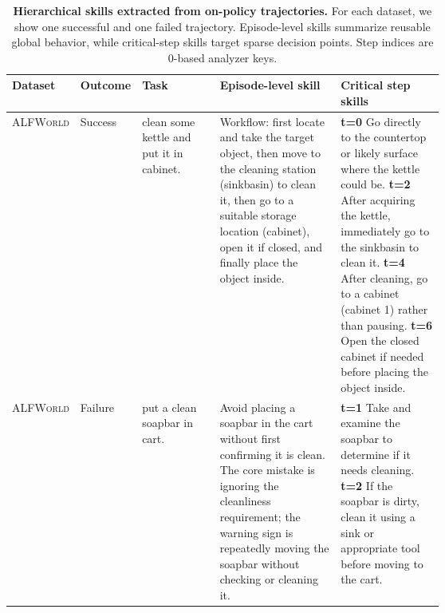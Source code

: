 \begin{table}[ht!]
\centering

\setlength{\belowcaptionskip}{6pt}

\caption{
\textbf{Hierarchical skills extracted from on-policy trajectories.}
For each dataset, we show one successful and one failed trajectory.
Episode-level skills summarize reusable global behavior, while critical-step
skills target sparse decision points. Step indices are 0-based analyzer keys.
}
\label{tab:hierarchical-skills-success-failure}

\scriptsize
\setlength{\tabcolsep}{2.4pt}
\renewcommand{\arraystretch}{1.10}

\begin{tabularx}{\linewidth}{
  >{\raggedright\arraybackslash}p{0.10\linewidth}
  >{\raggedright\arraybackslash}p{0.07\linewidth}
  >{\raggedright\arraybackslash}p{0.18\linewidth}
  >{\raggedright\arraybackslash}p{0.28\linewidth}
  >{\raggedright\arraybackslash}X
}
\toprule
\textbf{Dataset}
&
\textbf{Outcome}
&
\textbf{Task}
&
\textbf{Episode-level skill}
&
\textbf{Critical step skills}
\\
\midrule

\textsc{ALFWorld}
&
Success
&
clean some kettle and put it in cabinet.
&
Workflow: first locate and take the target object, then move to the cleaning
station (sinkbasin) to clean it, then go to a suitable storage location
(cabinet), open it if closed, and finally place the object inside.
&
\textbf{t=0} Go directly to the countertop or likely surface where the kettle
could be. \newline
\textbf{t=2} After acquiring the kettle, immediately go to the sinkbasin to
clean it. \newline
\textbf{t=4} After cleaning, go to a cabinet (cabinet 1) rather than pausing.
\newline
\textbf{t=6} Open the closed cabinet if needed before placing the object
inside.
\\

\addlinespace[0.30em]

\textsc{ALFWorld}
&
Failure
&
put a clean soapbar in cart.
&
Avoid placing a soapbar in the cart without first confirming it is clean.
The core mistake is ignoring the cleanliness requirement; the warning sign is
repeatedly moving the soapbar without checking or cleaning it.
&
\textbf{t=1} Take and examine the soapbar to determine if it needs cleaning.
\newline
\textbf{t=2} If the soapbar is dirty, clean it using a sink or appropriate
tool before moving to the cart.
\\


\end{tabularx}
\end{table}
